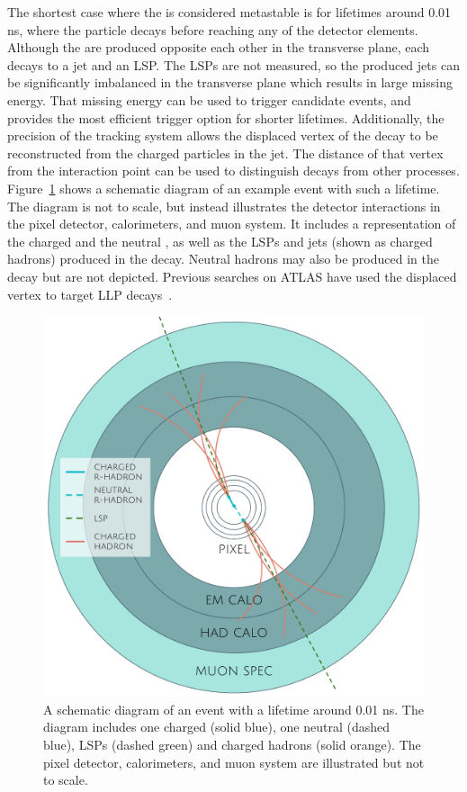 The shortest case where the \rhadron is considered metastable is for lifetimes around 0.01 ns, where the particle decays before reaching any of the detector elements.
Although the \rhadrons are produced opposite each other in the transverse plane, each \rhadron decays to a jet and an \ac{LSP}.
The \acp{LSP} are not measured, so the produced jets can be significantly imbalanced in the transverse plane which results in large missing energy.
That missing energy can be used to trigger candidate events, and provides the most efficient trigger option for shorter lifetimes.
Additionally, the precision of the tracking system allows the displaced vertex of the \rhadron decay to be reconstructed from the charged particles in the jet.
The distance of that vertex from the interaction point can be used to distinguish \rhadron decays from other processes.
Figure~\ref{fig:rhadron_displaced} shows a schematic diagram of an example \rhadron event with such a lifetime.
The diagram is not to scale, but instead illustrates the detector interactions in the pixel detector, calorimeters, and muon system.
It includes a representation of the charged \rhadron and the neutral \rhadron, as well as the \acp{LSP} and jets (shown as charged hadrons) produced in the decay.
Neutral hadrons may also be produced in the decay but are not depicted.
Previous searches on ATLAS have used the displaced vertex to target \ac{LLP} decays~\cite{SUSY-2014-02}.

\begin{figure}[h!]
\centering
\includegraphics[width=\halffig]{figures/rhadron_displaced.pdf}
\caption{A schematic diagram of an \rhadron event with a lifetime around 0.01 ns. The diagram includes one charged \rhadron (solid blue), one neutral \rhadron (dashed blue), \acp{LSP} (dashed green) and charged hadrons (solid orange). The pixel detector, calorimeters, and muon system are illustrated but not to scale.}
\label{fig:rhadron_displaced}
\end{figure}

